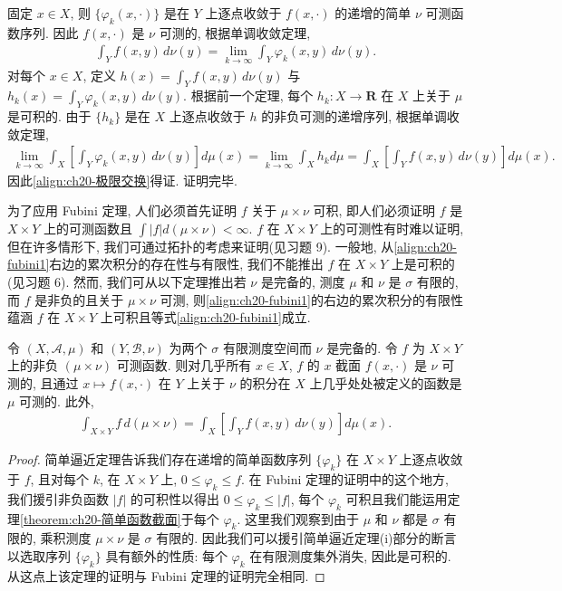 \documentclass[../../main.tex]{subfiles}
\begin{document}
固定 $x\in X$, 则 $\{\varphi_{k}(x,\cdot)\}$ 是在 $Y$ 上逐点收敛于 $f(x,\cdot)$ 的递增的简单 $\nu$ 可测函数序列. 因此 $f(x,\cdot)$ 是 $\nu$ 可测的, 根据单调收敛定理,
\begin{align}\label{align:ch20-截面单调收敛}
\int_{Y}f(x,y)\,d\nu(y)=\lim_{k\to\infty}\int_{Y}\varphi_{k}(x,y)\,d\nu(y).
\end{align}
对每个 $x\in X$, 定义 $h(x)=\int_{Y}f(x,y)\,d\nu(y)$ 与 $h_{k}(x)=\int_{Y}\varphi_{k}(x,y)\,d\nu(y)$. 根据前一个定理, 每个 $h_{k}:X\to\mathbf{R}$ 在 $X$ 上关于 $\mu$ 是可积的. 由于 $\{h_{k}\}$ 是在 $X$ 上逐点收敛于 $h$ 的非负可测的递增序列, 根据单调收敛定理,
\begin{align*}
\lim_{k\to\infty}\int_{X}\left[\int_{Y}\varphi_{k}(x,y)\,d\nu(y)\right]d\mu(x)=\lim_{k\to\infty}\int_{X}h_{k}d\mu=\int_{X}\left[\int_{Y}f(x,y)\,d\nu(y)\right]d\mu(x).
\end{align*}
因此\eqref{align:ch20-极限交换}得证. 证明完毕.

为了应用 Fubini 定理, 人们必须首先证明 $f$ 关于 $\mu\times\nu$ 可积, 即人们必须证明 $f$ 是 $X\times Y$ 上的可测函数且 $\int|f|d(\mu\times\nu)<\infty$. $f$ 在 $X\times Y$ 上的可测性有时难以证明, 但在许多情形下, 我们可通过拓扑的考虑来证明(见习题 9). 一般地, 从\eqref{align:ch20-fubini1}右边的累次积分的存在性与有限性, 我们不能推出 $f$ 在 $X\times Y$ 上是可积的(见习题 6). 然而, 我们可从以下定理推出若 $\nu$ 是完备的, 测度 $\mu$ 和 $\nu$ 是 $\sigma$ 有限的, 而 $f$ 是非负的且关于 $\mu\times\nu$ 可测, 则\eqref{align:ch20-fubini1}的右边的累次积分的有限性蕴涵 $f$ 在 $X\times Y$ 上可积且等式\eqref{align:ch20-fubini1}成立.

\begin{theorem}[Tonelli 定理]\label{theorem:ch20-tonelli}
令 $(X,\mathcal{A},\mu)$ 和 $(Y,\mathcal{B},\nu)$ 为两个 $\sigma$ 有限测度空间而 $\nu$ 是完备的. 令 $f$ 为 $X\times Y$ 上的非负 $(\mu\times\nu)$ 可测函数. 则对几乎所有 $x\in X$, $f$ 的 $x$ 截面 $f(x,\cdot)$ 是 $\nu$ 可测的, 且通过 $x\mapsto f(x,\cdot)$ 在 $Y$ 上关于 $\nu$ 的积分在 $X$ 上几乎处处被定义的函数是 $\mu$ 可测的. 此外,
\begin{align}\label{align:ch20-tonelli1}
\int_{X\times Y}f\,d(\mu\times\nu)=\int_{X}\left[\int_{Y}f(x,y)\,d\nu(y)\right]d\mu(x).
\end{align}
\end{theorem}

\begin{proof}
简单逼近定理告诉我们存在递增的简单函数序列 $\{\varphi_{k}\}$ 在 $X\times Y$ 上逐点收敛于 $f$, 且对每个 $k$, 在 $X\times Y$ 上, $0\leqslant\varphi_{k}\leqslant f$. 在 Fubini 定理的证明中的这个地方, 我们援引非负函数 $|f|$ 的可积性以得出 $0\leqslant\varphi_{k}\leqslant|f|$, 每个 $\varphi_{k}$ 可积且我们能运用定理\cref{theorem:ch20-简单函数截面}于每个 $\varphi_{k}$. 这里我们观察到由于 $\mu$ 和 $\nu$ 都是 $\sigma$ 有限的, 乘积测度 $\mu\times\nu$ 是 $\sigma$ 有限的. 因此我们可以援引简单逼近定理(i)部分的断言以选取序列 $\{\varphi_{k}\}$ 具有额外的性质: 每个 $\varphi_{k}$ 在有限测度集外消失, 因此是可积的. 从这点上该定理的证明与 Fubini 定理的证明完全相同.
\end{proof}
\end{document}
